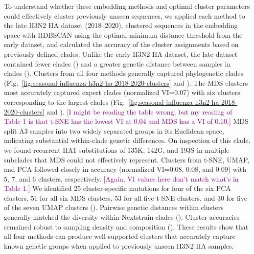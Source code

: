 \documentclass[10pt,letterpaper]{article}
\def\tbc#1{\textcolor{purple}{[#1]}}
\begin{document}
To understand whether these embedding methods and optimal cluster parameters could effectively cluster previously unseen sequences, we applied each method to the late H3N2 HA dataset (2018--2020), clustered sequences in the embedding space with HDBSCAN using the optimal minimum distance threshold from the early dataset, and calculated the accuracy of the cluster assignments based on previously defined clades.
Unlike the early H3N2 HA dataset, the late dataset contained fewer clades () and a greater genetic distance between samples in clades ().
Clusters from all four methods generally captured phylogenetic clades (Fig.~\ref{fig:seasonal-influenza-h3n2-ha-2018-2020-clusters} and ).
The MDS clusters most accurately captured expert clades (normalized VI=0.07) with six clusters corresponding to the largest clades (Fig.~\ref{fig:seasonal-influenza-h3n2-ha-2018-2020-clusters} and ).
\tbc{I might be reading the table wrong, but my reading of Table 1 is that t-SNE has the lowest VI at 0.04 and MDS has a VI of 0.10.}
MDS split A3 samples into two widely separated groups in its Euclidean space, indicating substantial within-clade genetic differences.
On inspection of this clade, we found recurrent HA1 substitutions of 135K, 142G, and 193S in multiple subclades that MDS could not effectively represent.
Clusters from t-SNE, UMAP, and PCA followed closely in accuracy (normalized VI=0.08, 0.08, and 0.09) with 5, 7, and 6 clusters, respectively.
\tbc{Again, VI values here don't match what's in Table 1.}
We identified 25 cluster-specific mutations for four of the six PCA clusters, 51 for all six MDS clusters, 53 for all five t-SNE clusters, and 30 for five of the seven UMAP clusters ().
Pairwise genetic distances within clusters generally matched the diversity within Nextstrain clades ().
Cluster accuracies remained robust to sampling density and composition ().
These results show that all four methods can produce well-supported clusters that accurately capture known genetic groups when applied to previously unseen H3N2 HA samples.
\end{document}
